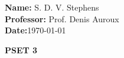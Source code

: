 \documentclass{report}
\begin{document}
\begin{titlebox}[Math 55a]
    \textbf{Name:} S. D. V. Stephens\\[2mm]
    \textbf{Professor:} Prof. Denis Auroux\\[2mm]
    \textbf{Date:}\today 
\tcblower
    \begin{center}
    \vspace{4mm}
    {\Huge\bfseries PSET 3}
    \end{center}
\end{titlebox}
\vspace{10mm}

\qs{}{}
\sol 

\qs{}{}
\sol 

\qs{}{}
\sol
\end{document}
